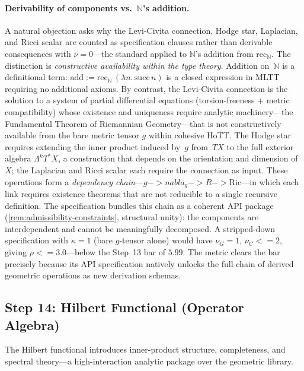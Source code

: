 \documentclass[11pt,a4paper]{article}
\def\leq{<=}%
\def\to{->}%
\def\nabla{nabla}%
\theoremstyle{plain}
\theoremstyle{definition}
\theoremstyle{remark}
\newcommand{\N}{\mathbb{N}}
\begin{document}
\paragraph{Derivability of components vs.\ $\N$'s addition.}
A natural objection asks why the Levi-Civita connection, Hodge star, Laplacian, and Ricci scalar are counted as specification clauses rather than derivable consequences with $\nu = 0$---the standard applied to $\N$'s addition from $\mathrm{rec}_\N$.
The distinction is \emph{constructive availability within the type theory}.
Addition on~$\N$ is a definitional term: $\mathrm{add} := \mathrm{rec}_\N\,(\lambda n.\,\mathrm{succ}\,n)$ is a closed expression in MLTT requiring no additional axioms.
By contrast, the Levi-Civita connection is the solution to a system of partial differential equations (torsion-freeness + metric compatibility) whose existence and uniqueness require analytic machinery---the Fundamental Theorem of Riemannian Geometry---that is not constructively available from the bare metric tensor $g$ within cohesive HoTT.
The Hodge star requires extending the inner product induced by~$g$ from~$TX$ to the full exterior algebra $\Lambda^k T^*X$, a construction that depends on the orientation and dimension of~$X$; the Laplacian and Ricci scalar each require the connection as input.
These operations form a \emph{dependency chain}---$g \to \nabla_g \to R \to \mathrm{Ric}$---in which each link requires existence theorems that are not reducible to a single recursive definition.
The specification bundles this chain as a coherent API package (\cref{rem:admissibility-constraints}, structural unity): the components are interdependent and cannot be meaningfully decomposed.
A stripped-down specification with $\kappa = 1$ (bare $g$-tensor alone) would have $\nu_G = 1$, $\nu_C \leq 2$, giving $\rho \leq 3.0$---below the Step~13 bar of $5.99$.
The metric clears the bar precisely because its API specification natively unlocks the full chain of derived geometric operations as new derivation schemas.

\subsection{Step 14: Hilbert Functional (Operator Algebra)}
\label{app:hilbert-spec}

The Hilbert functional introduces inner-product structure, completeness, and spectral theory---a high-interaction analytic package over the geometric library.
\end{document}
